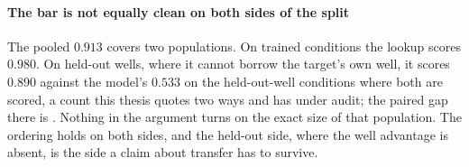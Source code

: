 \paragraph{The bar is not equally clean on both sides of the split} The pooled
$0.913$ covers two populations. On trained conditions the lookup scores $0.980$.
On held-out wells, where it cannot borrow the target's own well, it scores
$0.890$ against the model's $0.533$ on the  held-out-well
conditions where both are scored, a count this thesis quotes two ways and has
under audit; the paired gap there is . Nothing in the
argument turns on the exact size of that population. The ordering holds on both
sides, and the held-out side, where the well advantage is absent, is the side a
claim about transfer has to survive.

